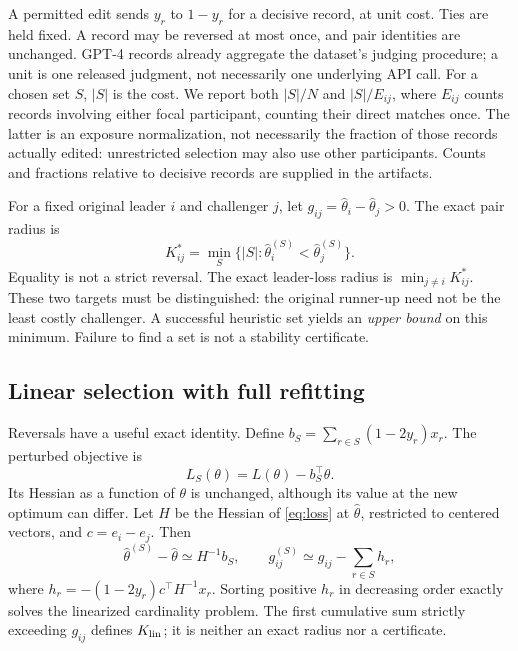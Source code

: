 \documentclass{article}
\begin{document}
A permitted edit sends $y_r$ to $1-y_r$ for a decisive record, at unit cost. Ties are held fixed. A record may be reversed at most once, and pair identities are unchanged. GPT-4 records already aggregate the dataset's judging procedure; a unit is one released judgment, not necessarily one underlying API call. For a chosen set $S$, $|S|$ is the cost. We report both $|S|/N$ and $|S|/E_{ij}$, where $E_{ij}$ counts records involving either focal participant, counting their direct matches once. The latter is an exposure normalization, not necessarily the fraction of those records actually edited: unrestricted selection may also use other participants. Counts and fractions relative to decisive records are supplied in the artifacts.

For a fixed original leader $i$ and challenger $j$, let $g_{ij}=\hat\theta_i-\hat\theta_j>0$. The exact pair radius is
\begin{equation}\label{eq:radius}
 K^*_{ij}=\min_S\{|S|:\hat\theta_i^{(S)}<\hat\theta_j^{(S)}\}.
\end{equation}
Equality is not a strict reversal. The exact leader-loss radius is $\min_{j\ne i}K^*_{ij}$. These two targets must be distinguished: the original runner-up need not be the least costly challenger. A successful heuristic set yields an \emph{upper bound} on this minimum. Failure to find a set is not a stability certificate.

\subsection{Linear selection with full refitting}
Reversals have a useful exact identity. Define $b_S=\sum_{r\in S}(1-2y_r)x_r$. The perturbed objective is
\begin{equation}\label{eq:linearperturb}
 L_S(\theta)=L(\theta)-b_S^\top\theta.
\end{equation}
Its Hessian as a function of $\theta$ is unchanged, although its value at the new optimum can differ. Let $H$ be the Hessian of \cref{eq:loss} at $\hat\theta$, restricted to centered vectors, and $c=e_i-e_j$. Then
\begin{equation}\label{eq:influence}
 \hat\theta^{(S)}-\hat\theta\simeq H^{-1}b_S,\qquad
 g_{ij}^{(S)}\simeq g_{ij}-\sum_{r\in S}h_r,
\end{equation}
where $h_r=-(1-2y_r)c^\top H^{-1}x_r$. Sorting positive $h_r$ in decreasing order exactly solves the linearized cardinality problem. The first cumulative sum strictly exceeding $g_{ij}$ defines $K_{\rm lin}$; it is neither an exact radius nor a certificate.
\end{document}
